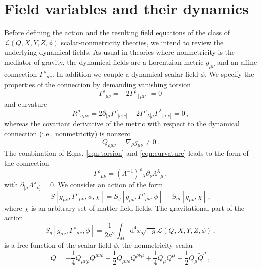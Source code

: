 \documentclass[notitlepage,a4paper,aps,prd,onecolumn,superscriptaddress,nofootinbib,groupedaddress,longbibliography]{revtex4-2}
\newcommand{\dd}{\mathrm{d}}
\begin{document}
\section{Field variables and their dynamics}\label{sec:action}
Before defining the action and the resulting field equations of the class of $\mathcal{L}(Q,X,Y,Z,\phi)$ scalar-nonmetricity theories, we intend to review the underlying dynamical fields. As usual in theories where nonmetricity is the mediator of gravity, the dynamical fields are a Lorentzian metric $g_{\mu\nu}$ and an affine connection $\Gamma^{\rho}{}_{\mu\nu}$. In addition we couple a dynamical scalar field $\phi$. We specify the properties of the connection by demanding vanishing torsion
\begin{equation}\label{eqn:torsion}
    T^{\rho}{}_{\mu\nu}=-2\Gamma^{\rho}{}_{[\mu\nu]}=0\,
\end{equation}
and curvature
\begin{equation}\label{eqn:curvature}
    R^{\rho}{}_{\sigma\mu\nu}=2\partial_{[\mu}\Gamma^{\rho}{}_{|\sigma|\nu]}+2\Gamma^{\rho}{}_{\lambda [\mu}\Gamma^{\lambda}{}_{|\sigma|\nu]}=0\,,
\end{equation}
whereas the covariant derivative of the metric with respect to the dynamical connection (i.e., nonmetricity) is nonzero
\begin{equation}
    Q_{\rho\mu\nu}=\nabla_{\rho}g_{\mu\nu}\neq 0\,.
\end{equation}
The combination of Eqns. \eqref{eqn:torsion} and  \eqref{eqn:curvature} leads to the form of the connection
\begin{equation}\label{eqn:connection}
    \Gamma^{\rho}{}_{\mu\nu}=\left(\Lambda^{-1}\right)^{\rho}{}_{\lambda}\partial_{\nu}\Lambda^{\lambda}{}_{\mu}\,,
\end{equation}
with $\partial_{[\mu}\Lambda^{\lambda}{}_{\nu]} = 0$. We consider an action of the form
    \begin{equation}
    S[g_{\mu\nu},\Gamma^{\rho}{}_{\mu\nu},\phi,\chi]=S_g[g_{\mu\nu},\Gamma^{\rho}{}_{\mu\nu},\phi]+ S_m[g_{\mu\nu},\chi]\,,
\end{equation}
where $\chi$ is an arbitrary set of matter field fields. The gravitational part of the action
\begin{equation}
    S_g[g_{\mu\nu},\Gamma^{\rho}{}_{\mu\nu},\phi]=\frac{1}{2\kappa^2}\int_{M}\dd^4x\sqrt{-g}\mathcal{L}(Q,X,Y,Z,\phi)\,,
\end{equation}
is a free function of the scalar field $\phi$, the nonmetricity scalar
\begin{equation}
    Q=-\frac{1}{4}Q_{\mu\nu\rho}Q^{\mu\nu\rho}+\frac{1}{2}Q_{\mu\nu\rho}Q^{\rho\nu\mu}+\frac{1}{4}Q_{\mu}Q^{\mu}-\frac{1}{2}Q_{\mu}\tilde{Q}^{\mu}\,,
\end{equation}
\end{document}
